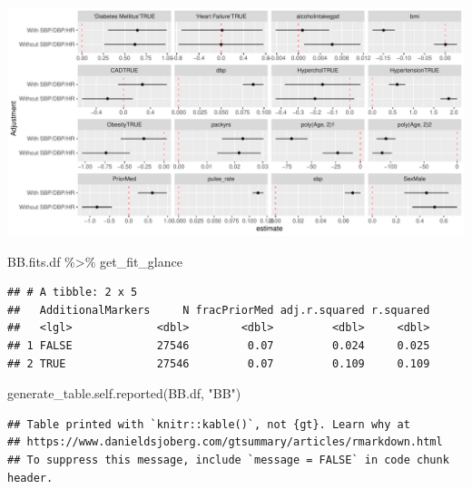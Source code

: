 \documentclass[
]{article}
\newenvironment{Shaded}{\begin{snugshade}}{\end{snugshade}}
\newcommand{\FunctionTok}[1]{\textcolor[rgb]{0.00,0.00,0.00}{#1}}
\newcommand{\NormalTok}[1]{#1}
\newcommand{\SpecialCharTok}[1]{\textcolor[rgb]{0.00,0.00,0.00}{#1}}
\newcommand{\StringTok}[1]{\textcolor[rgb]{0.31,0.60,0.02}{#1}}
\begin{document}
\includegraphics{../results/report_files/figure-latex/BB-fit-forest-1.pdf}

\begin{Shaded}
\begin{Highlighting}[]
\NormalTok{BB.fits.df }\SpecialCharTok{\%\textgreater{}\%} 
\NormalTok{  get\_fit\_glance}
\end{Highlighting}
\end{Shaded}

\begin{verbatim}
## # A tibble: 2 x 5
##   AdditionalMarkers     N fracPriorMed adj.r.squared r.squared
##   <lgl>             <dbl>        <dbl>         <dbl>     <dbl>
## 1 FALSE             27546         0.07         0.024     0.025
## 2 TRUE              27546         0.07         0.109     0.109
\end{verbatim}

\begin{Shaded}
\begin{Highlighting}[]
\FunctionTok{generate\_table.self.reported}\NormalTok{(BB.df, }\StringTok{"BB"}\NormalTok{)}
\end{Highlighting}
\end{Shaded}

\begin{verbatim}
## Table printed with `knitr::kable()`, not {gt}. Learn why at
## https://www.danieldsjoberg.com/gtsummary/articles/rmarkdown.html
## To suppress this message, include `message = FALSE` in code chunk header.
\end{verbatim}
\end{document}
